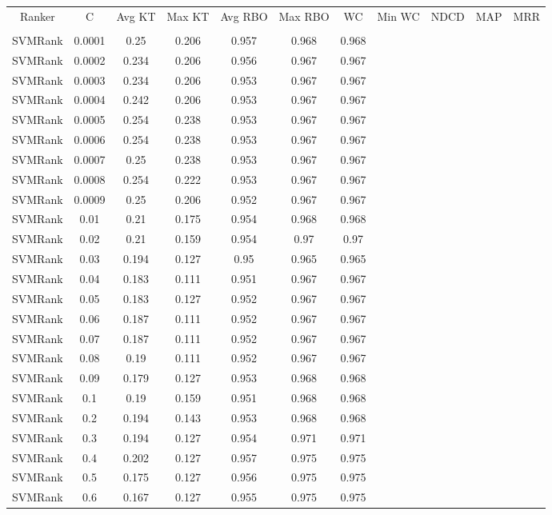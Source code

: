 \begin{longtable}{*{7}{c}}
Ranker & C & Avg KT & Max KT & Avg RBO & Max RBO & WC & Min WC & NDCD & MAP & MRR \\\\ 
SVMRank & 0.0001 & 0.25 & 0.206 & 0.957 & 0.968 & 0.968 \\ 
SVMRank & 0.0002 & 0.234 & 0.206 & 0.956 & 0.967 & 0.967 \\ 
SVMRank & 0.0003 & 0.234 & 0.206 & 0.953 & 0.967 & 0.967 \\ 
SVMRank & 0.0004 & 0.242 & 0.206 & 0.953 & 0.967 & 0.967 \\ 
SVMRank & 0.0005 & 0.254 & 0.238 & 0.953 & 0.967 & 0.967 \\ 
SVMRank & 0.0006 & 0.254 & 0.238 & 0.953 & 0.967 & 0.967 \\ 
SVMRank & 0.0007 & 0.25 & 0.238 & 0.953 & 0.967 & 0.967 \\ 
SVMRank & 0.0008 & 0.254 & 0.222 & 0.953 & 0.967 & 0.967 \\ 
SVMRank & 0.0009 & 0.25 & 0.206 & 0.952 & 0.967 & 0.967 \\ 
SVMRank & 0.01 & 0.21 & 0.175 & 0.954 & 0.968 & 0.968 \\ 
SVMRank & 0.02 & 0.21 & 0.159 & 0.954 & 0.97 & 0.97 \\ 
SVMRank & 0.03 & 0.194 & 0.127 & 0.95 & 0.965 & 0.965 \\ 
SVMRank & 0.04 & 0.183 & 0.111 & 0.951 & 0.967 & 0.967 \\ 
SVMRank & 0.05 & 0.183 & 0.127 & 0.952 & 0.967 & 0.967 \\ 
SVMRank & 0.06 & 0.187 & 0.111 & 0.952 & 0.967 & 0.967 \\ 
SVMRank & 0.07 & 0.187 & 0.111 & 0.952 & 0.967 & 0.967 \\ 
SVMRank & 0.08 & 0.19 & 0.111 & 0.952 & 0.967 & 0.967 \\ 
SVMRank & 0.09 & 0.179 & 0.127 & 0.953 & 0.968 & 0.968 \\ 
SVMRank & 0.1 & 0.19 & 0.159 & 0.951 & 0.968 & 0.968 \\ 
SVMRank & 0.2 & 0.194 & 0.143 & 0.953 & 0.968 & 0.968 \\ 
SVMRank & 0.3 & 0.194 & 0.127 & 0.954 & 0.971 & 0.971 \\ 
SVMRank & 0.4 & 0.202 & 0.127 & 0.957 & 0.975 & 0.975 \\ 
SVMRank & 0.5 & 0.175 & 0.127 & 0.956 & 0.975 & 0.975 \\ 
SVMRank & 0.6 & 0.167 & 0.127 & 0.955 & 0.975 & 0.975 \\ 

\end{longtable}
